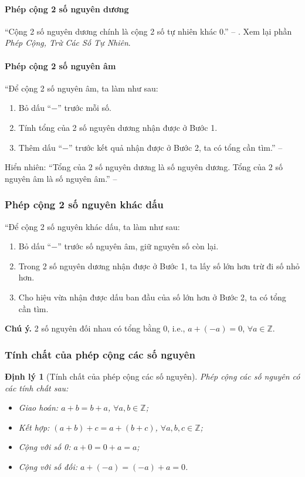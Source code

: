 \documentclass{article}
\numberwithin{equation}{section}
\newtheorem{dinhly}{Định lý}[section]
\begin{document}
\paragraph{Phép cộng 2 số nguyên dương}
``Cộng 2 số nguyên dương chính là cộng 2 số tự nhiên khác 0.'' -- \cite[p. 70]{SGK_Toan_6_Canh_Dieu_tap_1}. Xem lại phần \textit{Phép Cộng, Trừ Các Số Tự Nhiên}.

\paragraph{Phép cộng 2 số nguyên âm}
``Để cộng 2 số nguyên âm, ta làm như sau:
\begin{enumerate}
	\item Bỏ dấu ``$-$'' trước mỗi số.
	\item Tính tổng của 2 số nguyên dương nhận được ở Bước 1.
	\item Thêm dấu ``$-$'' trước kết quả nhận được ở Bước 2, ta có tổng cần tìm.'' -- \cite[p. 71]{SGK_Toan_6_Canh_Dieu_tap_1}
\end{enumerate}
Hiển nhiên: ``Tổng của 2 số nguyên dương là số nguyên dương. Tổng của 2 số nguyên âm là số nguyên âm.'' -- \cite[p. 71]{SGK_Toan_6_Canh_Dieu_tap_1}

\subsubsection{Phép cộng 2 số nguyên khác dấu}
``Để cộng 2 số nguyên khác dấu, ta làm như sau:
\begin{enumerate}
	\item Bỏ dấu ``$-$'' trước số nguyên âm, giữ nguyên số còn lại.
	\item Trong 2 số nguyên dương nhận được ở Bước 1, ta lấy số lớn hơn trừ đi số nhỏ hơn.
	\item Cho hiệu vừa nhận được dấu ban đầu của số lớn hơn ở Bước 2, ta có tổng cần tìm.
\end{enumerate}
\textbf{Chú ý.} 2 số nguyên đối nhau có tổng bằng 0, i.e., $a + (-a) = 0$, $\forall a\in\mathbb{Z}$.

\subsubsection{Tính chất của phép cộng các số nguyên}

\begin{dinhly}[Tính chất của phép cộng các số nguyên]
	Phép cộng các số nguyên có các tính chất sau:
	\begin{itemize}
		\item Giao hoán: $a + b = b + a$, $\forall a,b\in\mathbb{Z}$;
		\item Kết hợp: $(a + b) + c = a + (b + c)$, $\forall a,b,c\in\mathbb{Z}$;
		\item Cộng với số 0: $a + 0 = 0 + a = a$;
		\item Cộng với số đối: $a + (-a) = (-a) + a = 0$.
	\end{itemize}
\end{dinhly}
\end{document}
